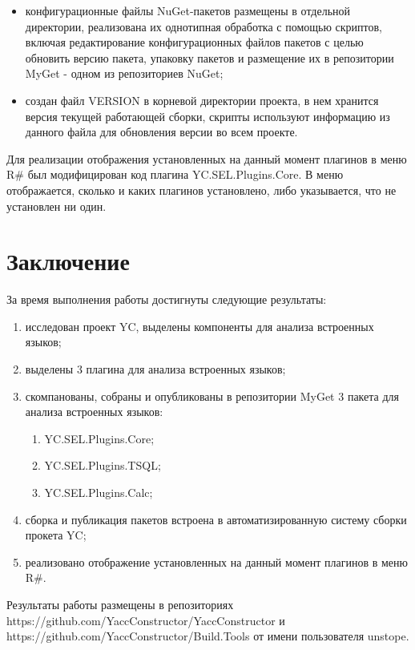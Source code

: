\documentclass{matmex-diploma-custom}
\begin{document}
\begin{itemize}
\item
конфигурационные файлы NuGet-пакетов размещены в отдельной директории, реализована их однотипная обработка с помощью скриптов, включая редактирование конфигурационных файлов пакетов с целью обновить версию пакета, упаковку пакетов и размещение их в репозитории MyGet - одном из репозиториев NuGet;
\item
создан файл VERSION в корневой директории проекта, в нем хранится версия текущей работающей сборки, скрипты используют информацию из данного файла для обновления версии во всем проекте.
\end{itemize}

Для реализации отображения установленных на данный момент плагинов в меню R\# был модифицирован код плагина YC.SEL.Plugins.Core. В меню отображается, сколько и каких плагинов установлено, либо указывается, что не установлен ни один.


\section*{Заключение}

За время выполнения работы достигнуты следующие результаты:

\begin{enumerate}
\item
исследован проект YC, выделены компоненты для анализа встроенных языков;
\item
выделены 3 плагина для анализа встроенных языков;
\item
скомпанованы, собраны и опубликованы в репозитории MyGet 3 пакета для анализа встроенных языков:
\begin{enumerate}
\item
YC.SEL.Plugins.Core;
\item
YC.SEL.Plugins.TSQL;
\item
YC.SEL.Plugins.Calc;
\end{enumerate}
\item
сборка и публикация пакетов встроена в автоматизированную систему сборки прокета YC;
\item
реализовано отображение установленных на данный момент плагинов в меню R\#.
\end{enumerate}

Результаты работы размещены в репозиториях https://github.com/YaccConstructor/YaccConstructor и https://github.com/YaccConstructor/Build.Tools от имени пользователя unstope.



\end{document}
